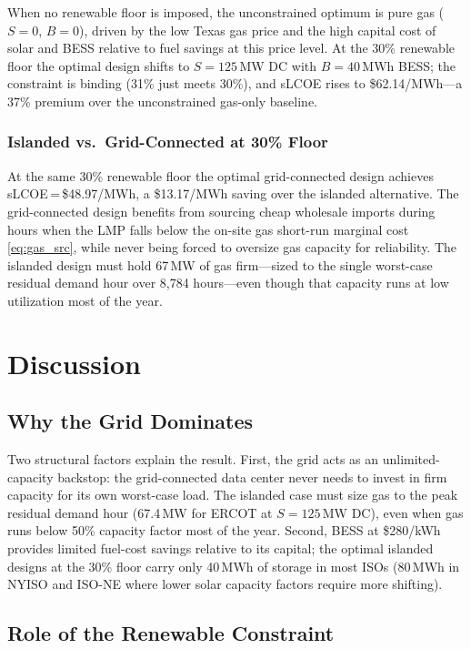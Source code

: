 \documentclass[conference]{IEEEtran}
\begin{document}
When no renewable floor is imposed, the unconstrained optimum is pure
gas ($S=0$, $B=0$), driven by the low Texas gas price and the high capital
cost of solar and BESS relative to fuel savings at this price level.
At the 30\% renewable floor the optimal design shifts to $S=125$\,MW DC
with $B=40$\,MWh BESS; the constraint is binding (31\% just meets 30\%),
and sLCOE rises to \$62.14/MWh---a 37\% premium over the unconstrained
gas-only baseline.

\subsubsection{Islanded vs.\ Grid-Connected at 30\% Floor}

At the same 30\% renewable floor the optimal grid-connected design achieves
sLCOE\,=\,\$48.97/MWh, a \$13.17/MWh saving over the islanded alternative.
The grid-connected design benefits from sourcing cheap wholesale imports
during hours when the LMP falls below the on-site gas short-run marginal
cost \eqref{eq:gas_src}, while never being forced to oversize gas capacity
for reliability.
The islanded design must hold 67\,MW of gas firm---sized to the
single worst-case residual demand hour over 8,784 hours---even though that
capacity runs at low utilization most of the year.

\section{Discussion}
\label{sec:discussion}

\subsection{Why the Grid Dominates}

Two structural factors explain the result.
First, the grid acts as an unlimited-capacity backstop: the grid-connected
data center never needs to invest in firm capacity for its own worst-case
load.
The islanded case must size gas to the peak residual demand hour (67.4\,MW
for ERCOT at $S=125$\,MW DC), even when gas runs below 50\% capacity factor
most of the year.
Second, BESS at \$280/kWh provides limited fuel-cost savings relative to its
capital; the optimal islanded designs at the 30\% floor carry only 40\,MWh
of storage in most ISOs (80\,MWh in NYISO and ISO-NE where lower solar
capacity factors require more shifting).

\subsection{Role of the Renewable Constraint}
\end{document}
